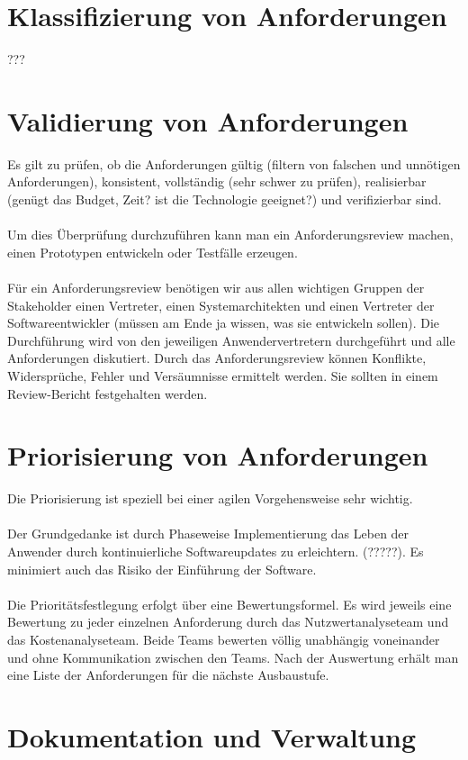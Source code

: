 \section{Klassifizierung von Anforderungen}
???
\section{Validierung von Anforderungen}
Es gilt zu prüfen, ob die Anforderungen gültig (filtern von falschen und unnötigen Anforderungen), konsistent, vollständig (sehr schwer zu prüfen), realisierbar (genügt das Budget, Zeit? ist die Technologie geeignet?) und verifizierbar sind.
\\\\
Um dies Überprüfung durchzuführen kann man ein Anforderungsreview machen, einen Prototypen entwickeln oder Testfälle erzeugen.
\\\\
Für ein Anforderungsreview benötigen wir aus allen wichtigen Gruppen der Stakeholder einen Vertreter, einen Systemarchitekten und einen Vertreter der Softwareentwickler (müssen am Ende ja wissen, was sie entwickeln sollen). Die Durchführung wird von den jeweiligen Anwendervertretern durchgeführt und alle Anforderungen diskutiert. Durch das Anforderungsreview können Konflikte, Widersprüche, Fehler und Versäumnisse ermittelt werden. Sie sollten in einem Review-Bericht festgehalten werden. 

\section{Priorisierung von Anforderungen}
Die Priorisierung ist speziell bei einer agilen Vorgehensweise sehr wichtig. 
\\\\
Der Grundgedanke ist durch Phaseweise Implementierung das Leben der Anwender durch kontinuierliche Softwareupdates zu erleichtern. (?????). Es minimiert auch das Risiko der Einführung der Software.
\\\\
Die Prioritätsfestlegung erfolgt über eine Bewertungsformel. Es wird jeweils eine Bewertung zu jeder einzelnen Anforderung durch das Nutzwertanalyseteam und das Kostenanalyseteam. Beide Teams bewerten völlig unabhängig voneinander und ohne Kommunikation zwischen den Teams. Nach der Auswertung erhält man eine Liste der Anforderungen für die nächste Ausbaustufe. 
\section{Dokumentation und Verwaltung}
